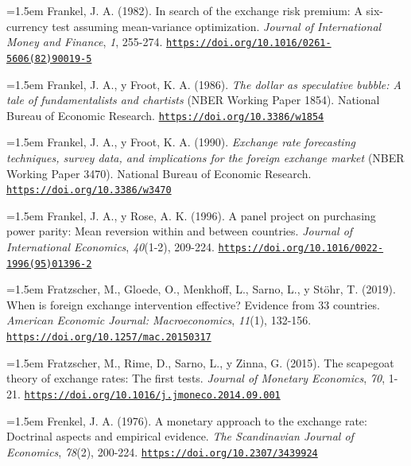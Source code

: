 \documentclass[10pt,a4paper]{article}
\begin{document}
\noindent\hangindent=1.5em Frankel, J. A. (1982). In search of the exchange risk premium: A six-currency test assuming mean-variance optimization. \textit{Journal of International Money and Finance}, \textit{1}, 255-274. \href{https://doi.org/10.1016/0261-5606(82)90019-5}{\nolinkurl{https://doi.org/10.1016/0261-5606(82)90019-5}}

\noindent\hangindent=1.5em Frankel, J. A., y Froot, K. A. (1986). \textit{The dollar as speculative bubble: A tale of fundamentalists and chartists} (NBER Working Paper 1854). National Bureau of Economic Research. \href{https://doi.org/10.3386/w1854}{\nolinkurl{https://doi.org/10.3386/w1854}}

\noindent\hangindent=1.5em Frankel, J. A., y Froot, K. A. (1990). \textit{Exchange rate forecasting techniques, survey data, and implications for the foreign exchange market} (NBER Working Paper 3470). National Bureau of Economic Research. \href{https://doi.org/10.3386/w3470}{\nolinkurl{https://doi.org/10.3386/w3470}}

\noindent\hangindent=1.5em Frankel, J. A., y Rose, A. K. (1996). A panel project on purchasing power parity: Mean reversion within and between countries. \textit{Journal of International Economics}, \textit{40}(1-2), 209-224. \href{https://doi.org/10.1016/0022-1996(95)01396-2}{\nolinkurl{https://doi.org/10.1016/0022-1996(95)01396-2}}

\noindent\hangindent=1.5em Fratzscher, M., Gloede, O., Menkhoff, L., Sarno, L., y Stöhr, T. (2019). When is foreign exchange intervention effective? Evidence from 33 countries. \textit{American Economic Journal: Macroeconomics}, \textit{11}(1), 132-156. \href{https://doi.org/10.1257/mac.20150317}{\nolinkurl{https://doi.org/10.1257/mac.20150317}}

\noindent\hangindent=1.5em Fratzscher, M., Rime, D., Sarno, L., y Zinna, G. (2015). The scapegoat theory of exchange rates: The first tests. \textit{Journal of Monetary Economics}, \textit{70}, 1-21. \href{https://doi.org/10.1016/j.jmoneco.2014.09.001}{\nolinkurl{https://doi.org/10.1016/j.jmoneco.2014.09.001}}

\noindent\hangindent=1.5em Frenkel, J. A. (1976). A monetary approach to the exchange rate: Doctrinal aspects and empirical evidence. \textit{The Scandinavian Journal of Economics}, \textit{78}(2), 200-224. \href{https://doi.org/10.2307/3439924}{\nolinkurl{https://doi.org/10.2307/3439924}}
\end{document}
